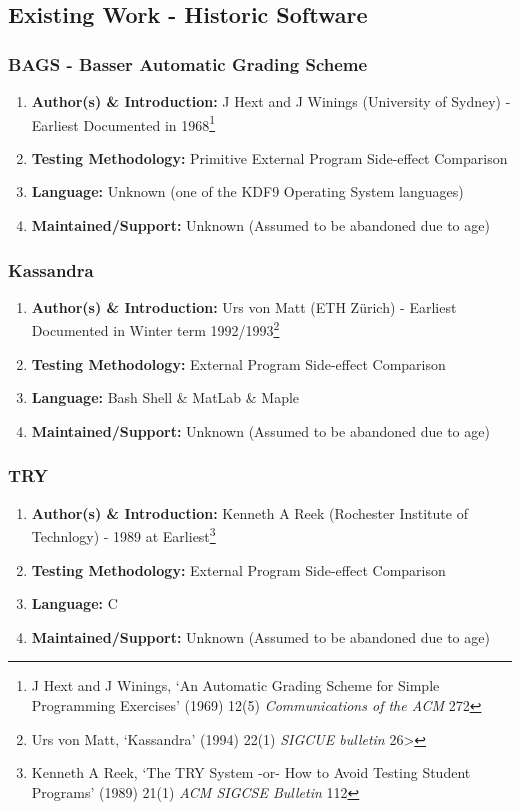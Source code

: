\documentclass[xcolor]{beamer}
\begin{document}
\subsection{Existing Work - Historic Software}
\begin{frame}
	\frametitle{BAGS - Basser Automatic Grading Scheme}
	\begin{enumerate}
		\setlength\itemsep{1em}
		\item \textbf{Author(s) \& Introduction:} J Hext and J Winings (University of Sydney) - Earliest Documented in 1968\footnote{J Hext and J Winings, ‘An Automatic Grading Scheme for Simple Programming Exercises’ (1969) 12(5) \textit{Communications of the ACM} 272}
			\pause
		\item \textbf{Testing Methodology:} Primitive External Program Side-effect Comparison
			\pause
		\item \textbf{Language:} Unknown (one of the KDF9 Operating System languages)
			\pause
		\item \textbf{Maintained/Support:} Unknown (Assumed to be abandoned due to age)
	\end{enumerate}
\end{frame}
\begin{frame}
	\frametitle{Kassandra}
	\begin{enumerate}
		\setlength\itemsep{1em}
		\item \textbf{Author(s) \& Introduction:} Urs von Matt (ETH Zürich) - Earliest Documented in Winter term 1992/1993\footnote{Urs von Matt, ‘Kassandra’ (1994) 22(1) \textit{SIGCUE bulletin} 26>}
			\pause
		\item \textbf{Testing Methodology:} External Program Side-effect Comparison
			\pause
		\item \textbf{Language:} Bash Shell \& MatLab \& Maple
			\pause
		\item \textbf{Maintained/Support:} Unknown (Assumed to be abandoned due to age)
	\end{enumerate}
\end{frame}
\begin{frame}
	\frametitle{TRY}
	\begin{enumerate}
		\setlength\itemsep{1em}
		\item \textbf{Author(s) \& Introduction:} Kenneth A Reek (Rochester Institute of Technlogy) - 1989 at Earliest\footnote{Kenneth A Reek, ‘The TRY System -or- How to Avoid Testing Student Programs’ (1989) 21(1) \textit{ACM SIGCSE Bulletin} 112}
			\pause
		\item \textbf{Testing Methodology:} External Program Side-effect Comparison
			\pause
		\item \textbf{Language:} C
			\pause
		\item \textbf{Maintained/Support:} Unknown (Assumed to be abandoned due to age)
	\end{enumerate}
\end{frame}
\end{document}
